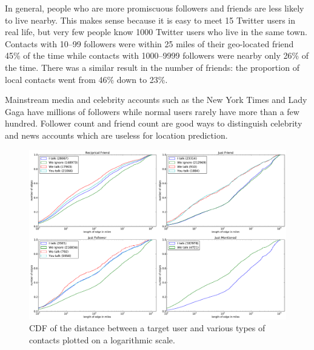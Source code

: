 \documentclass[letterpaper]{article}
\begin{document}
In general, people who are more promiscuous followers and friends are less
likely to live nearby.
%
This makes sense because it is easy to meet 15 Twitter users in real life, but
very few people know 1000 Twitter users who live in the same town.
%
Contacts with 10--99 followers were within 25 miles of their geo-located friend
45\% of the time while contacts with 1000--9999 followers were nearby only 26\%
of the time.
%
There was a similar result in the number of friends: the proportion of local
contacts went from 46\% down to 23\%.

Mainstream media and celebrity accounts such as the New York Times and Lady
Gaga have millions of followers while normal users rarely have more than a few
hundred.
%
Follower count and friend count are good ways to distinguish celebrity and news
accounts which are useless for location prediction.

\ifdefined\THESIS
    \begin{figure}[tb]
    \centering
    \includegraphics[width=.9\linewidth]{figures/com_types.pdf}
    \caption{
    CDF of the distance between a target user and various types of contacts
    plotted on a logarithmic scale.
    }
    \label{fig:ComTypes}
    \end{figure}
\fi
\end{document}
